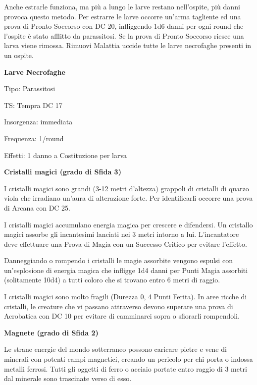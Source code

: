 \begin{multicols}{2}
Anche estrarle funziona, ma più a lungo le larve restano nell'ospite, più danni provoca questo metodo. Per estrarre le larve occorre un'arma tagliente ed una prova di Pronto Soccorso con DC 20, infliggendo 1d6 danni per ogni round che l'ospite è stato afflitto da parassitosi. Se la prova di Pronto Soccorso riesce una larva viene rimossa. Rimuovi Malattia uccide tutte le larve necrofaghe presenti in un ospite.

\medskip
\textbf{Larve Necrofaghe}

Tipo: Parassitosi

TS: Tempra DC 17

Insorgenza: immediata

Frequenza: 1/round

Effetti: 1 danno a Costituzione per larva

\medskip
\textbf{Cristalli magici (grado di Sfida 3)}

I cristalli magici sono grandi (3-12 metri d'altezza) grappoli di cristalli di quarzo viola che irradiano un'aura di alterazione forte. Per identificarli occorre una prova di Arcana con DC 25.

I cristalli magici accumulano energia magica per crescere e difendersi. Un cristallo magici assorbe gli incantesimi lanciati nei 3 metri intorno a lui. L'incantatore deve effettuare una Prova di Magia con un Successo Critico per evitare l'effetto.

Danneggiando o rompendo i cristalli le magie assorbite vengono espulsi con un'esplosione di energia magica che infligge 1d4 danni per Punti Magia assorbiti (solitamente 10d4) a tutti coloro che si trovano entro 6 metri di raggio.

I cristalli magici sono molto fragili (Durezza 0, 4 Punti Ferita).
In aree ricche di cristalli, le creature che vi passano attraverso devono superare una prova di Acrobatica con DC 10 per evitare di camminarci sopra o sfiorarli rompendoli.

\medskip
\textbf{Magnete (grado di Sfida 2)}

Le strane energie del mondo sotterraneo possono caricare pietre e vene di minerali con potenti campi magnetici, creando un pericolo per chi porta o indossa metalli ferrosi. Tutti gli oggetti di ferro o acciaio portate entro raggio di 3 metri dal minerale sono trascinate verso di esso.




\end{multicols}
